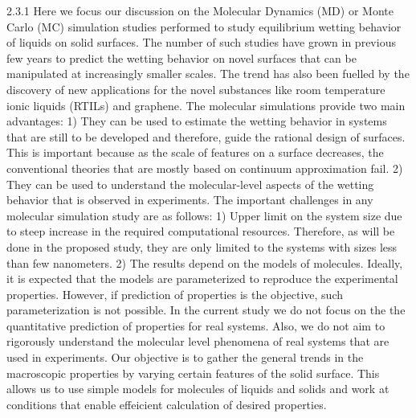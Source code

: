 \par 2.3.1 Here we focus our discussion on the Molecular Dynamics (MD) or Monte Carlo (MC) simulation studies performed to study equilibrium wetting behavior of liquids on solid surfaces. The number of such studies have grown in previous few years to predict the wetting behavior on novel surfaces that can be manipulated at increasingly smaller scales. The trend has also been fuelled by the discovery of new applications for the novel substances like room temperature ionic liquids (RTILs) and graphene. The molecular simulations provide two main advantages: 1) They can be used to estimate the wetting behavior in systems that are still to be developed and therefore, guide the rational design of surfaces. This is important because as the scale of features on a surface decreases, the conventional theories that are mostly based on continuum approximation fail.  2) They can be used to understand the molecular-level aspects of the wetting behavior that is observed in experiments. The important challenges in any molecular simulation study are as follows: 1) Upper limit on the system size due to steep increase in the required computational resources. Therefore, as will be done in the proposed study, they are only limited to the systems with sizes less than few nanometers. 2) The results depend on the models of molecules. Ideally, it is expected that the models are parameterized to reproduce the experimental properties. However, if prediction of properties is the objective, such parameterization is not possible. In the current study we do not focus on the the quantitative prediction of properties for real systems. Also, we do not aim to rigorously understand the molecular level phenomena of real systems that are used in experiments. Our objective is to gather the general trends in the macroscopic properties by varying certain features of the solid surface. This allows us to use simple models for molecules of liquids and solids and work at conditions that enable effeicient calculation of desired properties.
